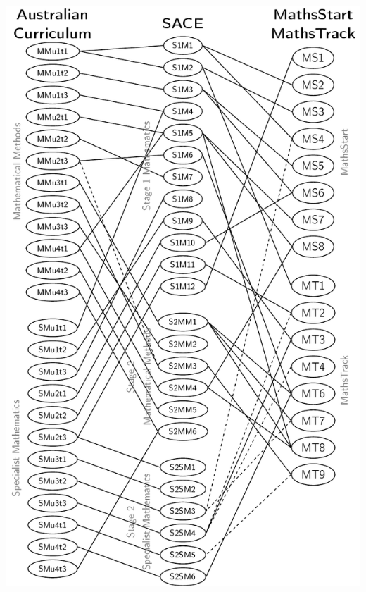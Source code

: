 \documentclass[14pt]{beamer}
\begin{document}
\begin{frame}
\begin{center}
\includegraphics[scale=0.32]{../figures/mapping.pdf}

\end{center}
\end{frame}
\end{document}
